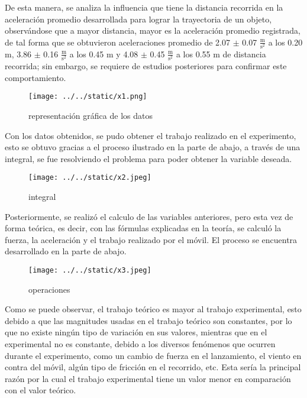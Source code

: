 \documentclass{article}
\begin{document}
De esta manera, se analiza la influencia que tiene la distancia recorrida en la aceleración promedio desarrollada para lograr la trayectoria de un objeto, observándose que a mayor distancia, mayor es la aceleración promedio registrada, de tal forma que se obtuvieron aceleraciones promedio de 2.07 $\pm$ 0.07 $\frac{\mathrm{m}}{\mathrm{s}^2}$ a los 0.20 m, 3.86 $\pm$ 0.16 $\frac{\mathrm{m}}{\mathrm{s}^2}$ a los 0.45 m y 4.08 $\pm$ 0.45 $\frac{\mathrm{m}}{\mathrm{s}^2}$ a los 0.55 m de distancia recorrida; sin embargo, se requiere de estudios posteriores para confirmar este comportamiento.

\begin{figure}[H]
	\centering	
	\texttt{[image: ../../static/x1.png]}
	\caption{representación gráfica de los datos}
	\label{fig:2}
\end{figure}

Con los datos obtenidos, se pudo obtener el trabajo realizado en el experimento, esto se obtuvo gracias a el proceso ilustrado en la parte de abajo, a través de una integral, se fue resolviendo el problema para poder obtener la variable deseada.

\begin{figure}[H]
	\centering	
	\texttt{[image: ../../static/x2.jpeg]}
	\caption{integral}
	\label{fig:3}
\end{figure}


Posteriormente, se realizó el calculo de las variables anteriores, pero esta vez de forma teórica, es decir, con las fórmulas explicadas en la teoría, se calculó la fuerza, la aceleración y el trabajo realizado por el móvil. El proceso se encuentra desarrollado en la parte de abajo.

\begin{figure}[H]
	\centering	
	\texttt{[image: ../../static/x3.jpeg]}
	\caption{operaciones}
	\label{fig:4}
\end{figure}

Como se puede observar, el trabajo teórico es mayor al trabajo experimental, esto debido a que las magnitudes usadas en el trabajo teórico son constantes, por lo que no existe ningún tipo de variación en sus valores, mientras que en el experimental no es constante, debido a los diversos fenómenos que ocurren durante el experimento, como un cambio de fuerza en el lanzamiento, el viento en contra del móvil, algún tipo de fricción en el recorrido, etc. Esta sería la principal razón por la cual el trabajo experimental tiene un valor menor en comparación con el valor teórico.
\end{document}
